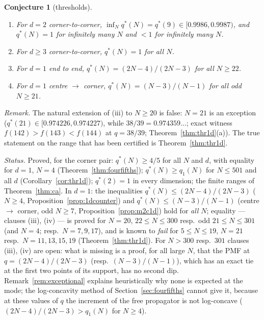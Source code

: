 \documentclass[11pt,a4paper]{article}
\newtheorem{conjecture}[theorem]{Conjecture}
\theoremstyle{definition}
\begin{document}
\begin{conjecture}[thresholds]\label{conj:thr}
\begin{enumerate}
\item[(i)] For $d=2$ corner-to-corner, $\inf_Nq^*(N)=q^*(9)\in[0.9986,0.9987)$, and $q^*(N)=1$ for infinitely many $N$ and $<1$ for infinitely many $N$.
\item[(ii)] For $d\ge3$ corner-to-corner, $q^*(N)=1$ for all $N$.
\item[(iii)] For $d=1$ end to end, $q^*(N)=(2N-4)/(2N-3)$ for all $N\ge22$.
\item[(iv)] For $d=1$ centre $\to$ corner, $q^*(N)=(N-3)/(N-1)$ for all odd $N\ge21$.
\end{enumerate}
\end{conjecture}
\emph{Remark.} The natural extension of (iii) to $N\ge20$ is false: $N=21$ is an exception ($q^*(21)\in[0.974226,0.974227)$, while $38/39=0.974359\ldots$; exact witness $f(142)>f(143)<f(144)$ at $q=38/39$; Theorem~\ref{thm:thr1d}(a)).
The true statement on the range that has been certified is Theorem~\ref{thm:thr1d}.

\emph{Status.} Proved, for the corner pair: $q^*(N)\ge4/5$ for all $N$ and $d$, with equality for $d=1$, $N=4$ (Theorem~\ref{thm:fourfifths}); $q^*(N)\ge q_1(N)$ for $N\le501$ and all $d$ (Corollary~\ref{cor:thr1d}); $q^*(2)=1$ in every dimension; the finite ranges of Theorem~\ref{thm:ca}. In $d=1$: the inequalities $q^*(N)\le(2N-4)/(2N-3)$ ($N\ge4$, Proposition~\ref{prop:1dcounter}) and $q^*(N)\le(N-3)/(N-1)$ (centre $\to$ corner, odd $N\ge7$, Proposition~\ref{prop:m2c1d}) hold for \emph{all} $N$; equality --- clauses (iii), (iv) --- is proved for $N=20$, $22\le N\le300$ resp.\ odd $21\le N\le301$ (and $N=4$; resp.\ $N=7,9,17$), and is known to \emph{fail} for $5\le N\le19$, $N=21$ resp.\ $N=11,13,15,19$ (Theorem~\ref{thm:thr1d}). For $N>300$ resp.\ $301$ clauses (iii), (iv) are open: what is missing is a proof, for all large $N$, that the PMF at $q=(2N-4)/(2N-3)$ (resp.\ $(N-3)/(N-1)$), which has an exact tie at the first two points of its support, has no second dip. Remark~\ref{rem:exceptional} explains heuristically why none is expected at the mode; the log-concavity method of Section~\ref{sec:fourfifths} cannot give it, because at these values of $q$ the increment of the free propagator is not log-concave ($(2N-4)/(2N-3)>q_1(N)$ for $N\ge4$).
\end{document}
